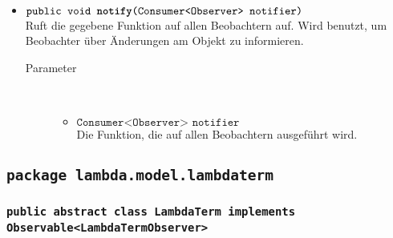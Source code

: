 \begin{description}
\begin{itemize}
		\item $\texttt{public void \textbf{notify}(Consumer<Observer> notifier)}$ \\ Ruft die gegebene Funktion auf allen Beobachtern auf. Wird benutzt, um Beobachter über Änderungen am Objekt zu informieren.
		\begin{description}
			\item[Parameter] \hfill \\
			\vspace{-.8cm}
			\begin{itemize}
				\item $\texttt{Consumer<Observer> notifier}$ \\ Die Funktion, die auf allen Beobachtern ausgeführt wird.
			\end{itemize}
		\end{description}
	\end{itemize}
\end{description}

\subsection{\texttt{package lambda.model.lambdaterm}}

\subsubsection{\normalfont \texttt{public abstract class \textbf{LambdaTerm} implements Observable<LambdaTermObserver>}}

